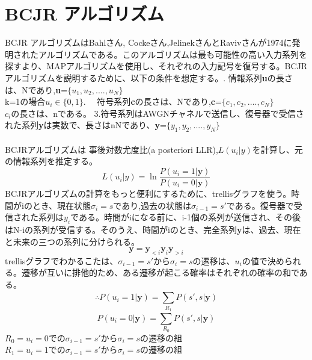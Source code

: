 \documentclass[20 pts]{article}
\begin{document}
\section{BCJR アルゴリズム}
BCJR アルゴリズムはBahlさん, Cockeさん,JelinekさんとRavivさんが1974に発明されたアルゴリズムである。このアルゴリズムは最も可能性の高い入力系列を探すより、MAPアルゴリズムを使用し、それぞれの入力記号を復号する。BCJR アルゴリズムを説明するために、以下の条件を想定する。. 情報系列\textbf{u}の長さは、Nであり,\textbf{u}=$\{u_1,u_2,....,u_N\}$\\
k=1の場合$u_i\in \{0,1\}$. 　符号系列\textbf{c}の長さは、Nであり,\textbf{c}=$\{c_1,c_2,....,c_N\}$\\
$c_i$の長さは、nである。\newline
3.符号系列はAWGNチャネルで送信し、復号器で受信された系列\textbf{y}は実数で、長さはnNであり、\textbf{y}=$\{y_1,y_2,....,y_N\}$\paragraph{}
BCJRアルゴリズムは 事後対数尤度比(a posteriori LLR),$L(u_i|y)$を計算し、元の情報系列を推定する。\begin{equation}L(u_i|y)=\ln\frac{P(u_i=1|\boldsymbol{y})}{P(u_i=0|\boldsymbol{y})}\end{equation}
BCJRアルゴリズムの計算をもっと便利にするために、trellisグラフを使う。時間がiのとき、現在状態$\sigma_i=s$であり,過去の状態は$\sigma_{i-1}=s'$である。復号器で受信された系列は$y_i$である。時間がiになる前に、i-1個の系列が送信され、その後はN-iの系列が受信する。そのうえ、時間がiのとき、完全系列\textbf{y}は、過去、現在と未来の三つの系列に分けられる。$$\boldsymbol{y}=\boldsymbol{y}_{<i} \boldsymbol{y}_{i} \boldsymbol{y}_{>i}$$trellisグラフでわかるこたは、$\sigma_{i-1}=s'$から$\sigma_i=s$の遷移は、$u_i$の値で決められる。遷移が互いに排他的ため、ある遷移が起こる確率はそれぞれの確率の和である。
$$\therefore P(u_i=1|\boldsymbol{y})=\sum_{R_1}^{}P(s',s|\boldsymbol{y})$$
$$P(u_i=0|\boldsymbol{y})=\sum_{R_0}^{}P(s',s|\boldsymbol{y})$$
$R_0=u_i=0$での$\sigma_{i-1}=s'$から$\sigma_i=s$の遷移の組\\
$R_1=u_i=1$での$\sigma_{i-1}=s'$から$\sigma_i=s$の遷移の組\\
\end{document}
